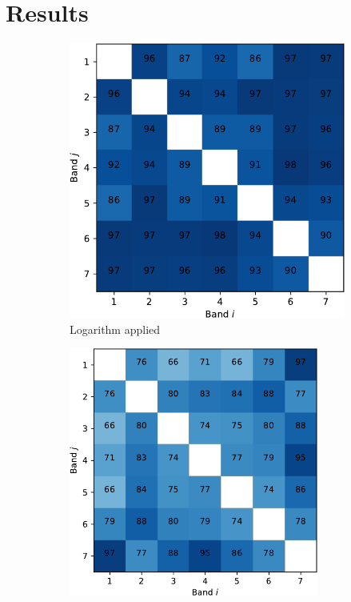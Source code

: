 \documentclass{article}
\begin{document}
\section{Results}

\begin{figure}[h] 
  \begin{subfigure}[b]{0.49\linewidth}
    \centering
    \includegraphics[width=0.9\linewidth]{sup-crop.pdf} 
    \caption{Logarithm applied} 
    \label{fig7:a} 
  \end{subfigure}%
  \begin{subfigure}[b]{0.49\linewidth}
    \centering
    \includegraphics[width=0.9\textwidth]{un-crop.pdf} 

\end{subfigure}
\end{figure}
\end{document}
